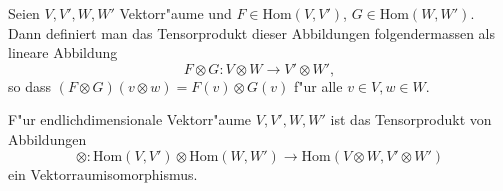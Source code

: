 \documentclass[8pt, a4paper, twocolumn, landscape]{article}
\newcommand{\comment}[1]{}
\begin{document}
\comment{
\begin{theorem}
Ist $\mathrm{dim}V < \infty$, so ist $(1a)$ ein Isomorphismus und falls zus"atzlich $\mathrm{char}K = 2$, so ist $(1s)$ auch ein Isomorphismus.
\end{theorem}
}

\begin{definition}
Seien $V, V', W, W'$ Vektorr"aume und $F \in \mathrm{Hom}(V, V')$, $G \in \mathrm{Hom}(W, W')$. Dann definiert man das Tensorprodukt dieser Abbildungen folgendermassen als lineare Abbildung
$$
F \otimes G: V \otimes W \rightarrow V' \otimes W',
$$
so dass $(F \otimes G)(v \otimes w) = F(v) \otimes G(v)$ f"ur alle $v\in V, w \in W$.
\end{definition}

\begin{theorem}
F"ur endlichdimensionale Vektorr"aume $V, V', W, W'$ ist das Tensorprodukt von Abbildungen 
$$
\otimes: \mathrm{Hom}(V, V') \otimes  \mathrm{Hom}(W, W') \rightarrow \mathrm{Hom}(V \otimes W, V' \otimes W')
$$
ein Vektorraumisomorphismus.
\end{theorem}
\end{document}
